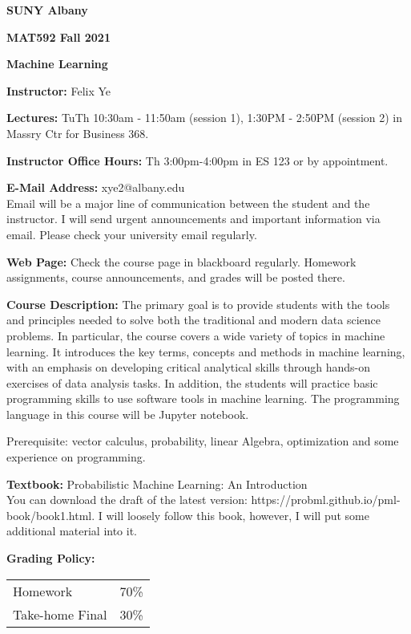 \documentclass[a4paper,10pt]{article}
\begin{document}
\begin{center}

\textbf{SUNY Albany}

\textbf{MAT592 Fall 2021}

\textbf{Machine Learning}


\end{center}

\textbf{Instructor:} Felix Ye 

\textbf{Lectures:} TuTh 10:30am - 11:50am (session 1), 1:30PM - 2:50PM (session 2) in Massry Ctr for Business 368.

\textbf{Instructor Office Hours:} Th 3:00pm-4:00pm in ES 123 or by appointment. 


\textbf{E-Mail Address:} xye2@albany.edu\\
Email will be a major line of communication between the student and the instructor. I will send urgent announcements and important information via email. Please check your university email regularly.

\textbf{Web Page:}
Check the course page in blackboard regularly. Homework assignments, course announcements, and grades will be posted there.

\textbf{Course Description:} The primary goal is to provide students with the tools and principles needed to solve both the traditional and modern data science problems. In particular, the course covers a wide variety of topics in machine learning. It introduces the key terms, concepts and methods in machine learning, with an emphasis on developing critical analytical skills through hands-on exercises of data analysis tasks. In addition, the students will practice basic programming skills to use software tools in machine learning. The programming language in this course will be Jupyter notebook.

 Prerequisite: vector calculus, probability, linear Algebra, optimization and some experience on programming. 
 

\textbf{Textbook:} Probabilistic Machine Learning: An Introduction \\
You can download the draft of the latest version: https://probml.github.io/pml-book/book1.html. 
 I will loosely follow this book, however, I will put some additional material into it.


\textbf{Grading Policy:}

\begin{tabular}{lr}
Homework & 70\%\\ 
Take-home Final & 30\% \\
\end{tabular}
\end{document}
